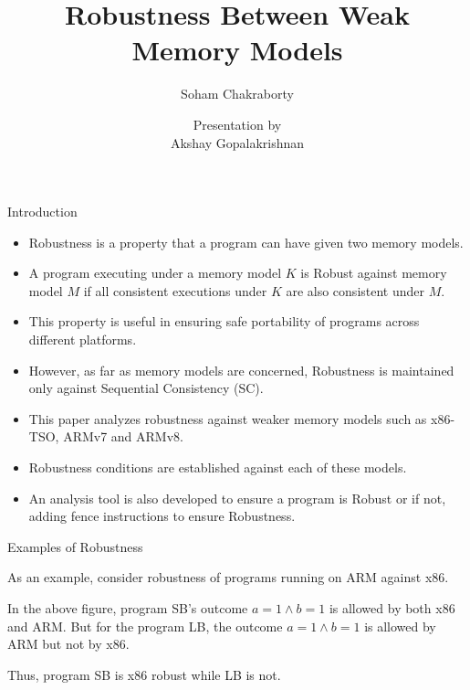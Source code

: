 \documentclass[notes, xcolor=dvipsnames]{beamer}
\title{Robustness Between Weak Memory Models}
\subtitle{Soham Chakraborty}
\author{Presentation by \\ Akshay Gopalakrishnan}
\begin{document}
    
    \begin{frame}

        \maketitle

    \end{frame}

    \begin{frame}{Introduction}

        \begin{itemize}
            \item Robustness is a property that a program can have given two memory models.
            \item A program executing under a memory model $K$ is Robust against memory model $M$ if all consistent executions under $K$ are also consistent under $M$.
            \item This property is useful in ensuring safe portability of programs across different platforms.
            \item However, as far as memory models are concerned, Robustness is maintained only against Sequential Consistency (SC).
            \item This paper analyzes robustness against weaker memory models such as x86-TSO, ARMv7 and ARMv8. 
            \item Robustness conditions are established against each of these models.
            \item An analysis tool is also developed to ensure a program is Robust or if not, adding fence instructions to ensure Robustness.   
        \end{itemize}

    \end{frame}

    \begin{frame}{Examples of Robustness}

        As an example, consider robustness of programs running on ARM against x86. 
        \begin{figure}
        \end{figure}
        In the above figure, program SB's outcome $a=1 \wedge b=1$ is allowed by both x86 and ARM. 
        But for the program LB, the outcome $a=1 \wedge b=1$ is allowed by ARM but not by x86.

        Thus, program SB is x86 robust while LB is not. 

    \end{frame}
\end{document}
